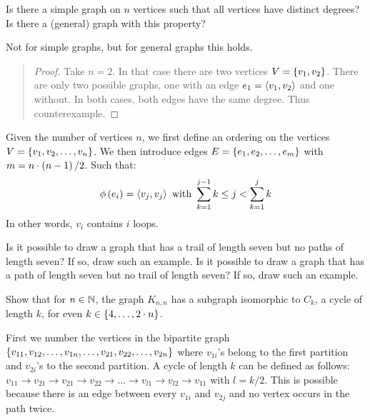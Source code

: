\documentclass{article}
\begin{document}
\begin{exercise}
Is there a simple graph on $n$ vertices such that all vertices have distinct degrees? Is there a (general) graph with this property?
\begin{answer}
Not for simple graphs, but for general graphs this holds.
\begin{quote}\begin{proof}
Take $n=2$. In that case there are two vertices $V=\left\{ v_1,v_2 \right\}$. There are only two possible graphs, one with an edge $e_1=\left\langle v_1,v_2 \right\rangle$ and one without. In both cases, both edges have the same degree. Thus counterexample.
\end{proof}\end{quote}
\begin{construction}
Given the number of vertices $n$, we first define an ordering on the vertices $V=\left\{ v_1,v_2,\ldots,v_n \right\}$. We then introduce edges $E=\left\{ e_1,e_2,\ldots,e_m \right\}$ with $m=n\cdot\left( n-1 \right)/2$. Such that:
\begin{equation}
\phi\left( e_i \right)=\left\langle v_j,v_j \right\rangle\mbox{ with }\displaystyle\sum_{k=1}^{j-1}{k}\leq j<\displaystyle\sum_{k=1}^{j}{k}
\end{equation}
In other words, $v_i$ contains $i$ loops.
\end{construction}
\end{answer}
\end{exercise}

\begin{exercise}
Is it possible to draw a graph that has a trail of length seven but no paths of length seven? If so, draw such an example. Is it possible to draw a graph that has a path of length seven but no trail of length seven? If so, draw such an example.
\begin{answer}
\end{answer}
\end{exercise}

\begin{exercise}
Show that for $n\in\mathbb{N}$, the graph $K_{n,n}$ has a subgraph isomorphic to $C_k$, a cycle of length $k$, for even $k\in\left\{ 4,\ldots,2\cdot n \right\}$.
\begin{answer}
First we number the vertices in the bipartite graph $\left\{ v_{11},v_{12},\ldots,v_{1n},\ldots,v_{21},v_{22},\ldots,v_{2n} \right\}$ where $v_{1i}$'s belong to the first partition and $v_{2i}$'s to the second partition. A cycle of length $k$ can be defined as follows: $v_{11}\rightarrow v_{21}\rightarrow v_{21}\rightarrow v_{22}\rightarrow\ldots\rightarrow v_{l1}\rightarrow v_{l2}\rightarrow v_{11}$ with $l=k/2$. This is possible because there is an edge between every $v_{1i}$ and $v_{2j}$ and no vertex occurs in the path twice.
\end{answer}
\end{exercise}
\end{document}
